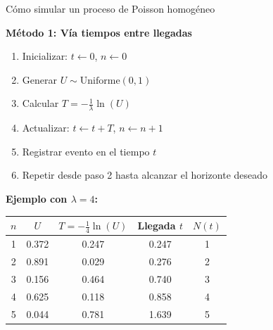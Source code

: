 \documentclass[aspectratio=1610, 9pt]{beamer}
\begin{document}
\begin{frame}{C\'{o}mo simular un proceso de Poisson homog\'{e}neo}

\textbf{M\'{e}todo 1: V\'{i}a tiempos entre llegadas}

\vspace{0.2cm}
\begin{enumerate}
    \item Inicializar: $t \leftarrow 0$, $n \leftarrow 0$
    \item Generar $U \sim \text{Uniforme}(0,1)$
    \item Calcular $T = -\frac{1}{\lambda}\ln(U)$
    \item Actualizar: $t \leftarrow t + T$, $n \leftarrow n + 1$
    \item Registrar evento en el tiempo $t$
    \item Repetir desde paso 2 hasta alcanzar el horizonte deseado
\end{enumerate}

\vspace{0.3cm}
\textbf{Ejemplo con $\lambda = 4$:}

\renewcommand{\arraystretch}{1.2}
\begin{center}
\small
\begin{tabular}{ccccc}
\toprule
$n$ & $U$ & $T = -\frac{1}{4}\ln(U)$ & Llegada $t$ & $N(t)$ \\
\midrule
1 & 0.372 & 0.247 & 0.247 & 1 \\
2 & 0.891 & 0.029 & 0.276 & 2 \\
3 & 0.156 & 0.464 & 0.740 & 3 \\
4 & 0.625 & 0.118 & 0.858 & 4 \\
5 & 0.044 & 0.781 & 1.639 & 5 \\
\bottomrule
\end{tabular}
\end{center}
\end{frame}
\end{document}
